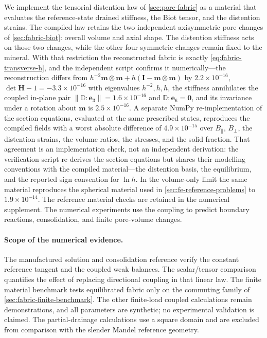 We implement the tensorial distention law of \cref{sec:pore-fabric} as a
material that evaluates the reference-state drained stiffness, the Biot
tensor, and the distention strains. The compiled law retains the
two independent axisymmetric pore changes of \cref{sec:fabric-biot}:
overall volume and axial shape. The distention stiffness acts on those two
changes, while the other four symmetric changes remain fixed to the mineral.
With that restriction the reconstructed fabric is exactly
\eqref{eq:fabric-transverse-h}, and the independent script confirms it
numerically---the reconstruction differs from
\(h^{-2}\mathbf m\otimes\mathbf m+h(\mathbf I-\mathbf m\otimes\mathbf m)\)
by \(2.2\times10^{-16}\), \(\det\mathbf H-1=-3.3\times10^{-16}\) with
eigenvalues \(h^{-2},h,h\), the stiffness annihilates the coupled in-plane
pair \(\lVert\mathbb D:\mathbf e_3\rVert=1.6\times10^{-16}\) and
\(\mathbb D:\mathbf e_6=\mathbf 0\), and its invariance under a rotation
about \(\mathbf m\) is \(2.5\times10^{-16}\). A separate NumPy
re-implementation
of the section equations, evaluated at the same prescribed states,
reproduces the compiled fields with a worst absolute difference of
\(4.9\times10^{-15}\) over \(B_\parallel\), \(B_\perp\), the distention
strains, the volume ratios, the stresses, and the solid fraction. That
agreement is an implementation check, not an independent derivation:
the verification script re-derives the section equations but
shares their modelling conventions with the compiled material---the
distention basis, the equilibrium, and the reported sign convention for
\(\ln h\). In the volume-only limit the same material reproduces the
spherical material used in \cref{sec:fe-reference-problems} to
\(1.9\times10^{-14}\).
The reference material checks are retained in the numerical supplement.
The numerical experiments use the coupling to predict boundary reactions,
consolidation, and finite pore-volume changes.



\paragraph{Scope of the numerical evidence.}
The manufactured solution and consolidation reference verify the constant
reference tangent and the coupled weak balances. The scalar/tensor comparison
quantifies the effect of replacing directional coupling in that linear law.
The finite material benchmark tests equilibrated fabric only on the commuting
family of \cref{sec:fabric-finite-benchmark}. The other finite-load coupled
calculations remain demonstrations, and all parameters are synthetic;
no experimental validation is claimed. The partial-drainage calculations
use a square domain and are excluded from comparison with the slender
Mandel reference geometry.
\FloatBarrier
